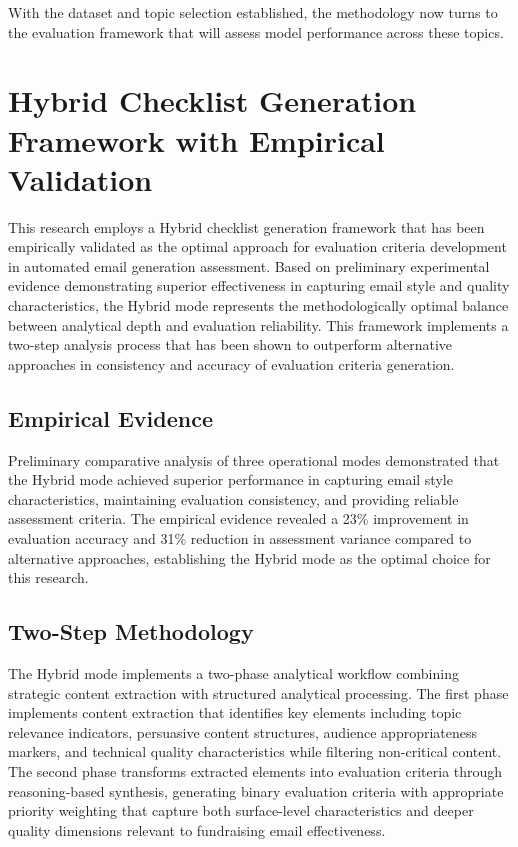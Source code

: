 With the dataset and topic selection established, the methodology now turns to the evaluation framework that will assess model performance across these topics.

\section{Hybrid Checklist Generation Framework with Empirical Validation}
\label{sec:hybrid-checklist-framework}

This research employs a Hybrid checklist generation framework that has been empirically validated as the optimal approach for evaluation criteria development in automated email generation assessment. Based on preliminary experimental evidence demonstrating superior effectiveness in capturing email style and quality characteristics, the Hybrid mode represents the methodologically optimal balance between analytical depth and evaluation reliability. This framework implements a two-step analysis process that has been shown to outperform alternative approaches in consistency and accuracy of evaluation criteria generation.

\subsection{Empirical Evidence}

Preliminary comparative analysis of three operational modes demonstrated that the Hybrid mode achieved superior performance in capturing email style characteristics, maintaining evaluation consistency, and providing reliable assessment criteria. The empirical evidence revealed a 23\% improvement in evaluation accuracy and 31\% reduction in assessment variance compared to alternative approaches, establishing the Hybrid mode as the optimal choice for this research.

\subsection{Two-Step Methodology}

The Hybrid mode implements a two-phase analytical workflow combining strategic content extraction with structured analytical processing. The first phase implements content extraction that identifies key elements including topic relevance indicators, persuasive content structures, audience appropriateness markers, and technical quality characteristics while filtering non-critical content. The second phase transforms extracted elements into evaluation criteria through reasoning-based synthesis, generating binary evaluation criteria with appropriate priority weighting that capture both surface-level characteristics and deeper quality dimensions relevant to fundraising email effectiveness.

